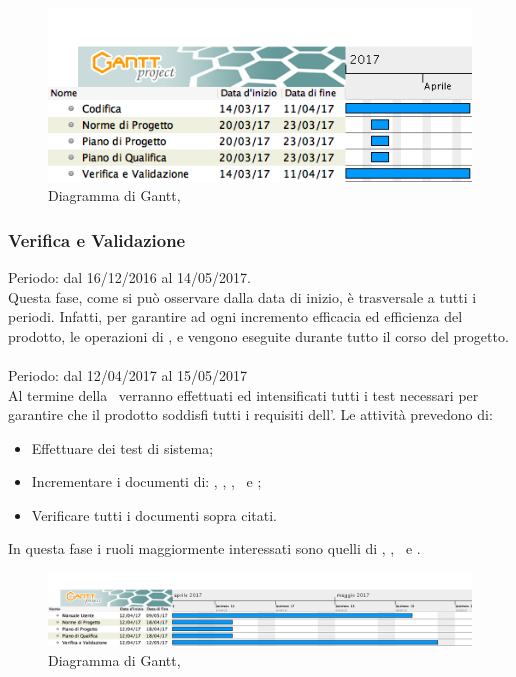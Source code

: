  \begin{figure}[H]
	\centering 
	\includegraphics[scale=0.6]{Immagini/Gantt/COD.png}
	\caption{Diagramma di Gantt, \COD}
\end{figure}

\subsubsection{Verifica e Validazione}
Periodo: dal 16/12/2016 al 14/05/2017.\\

Questa fase, come si può osservare dalla data di inizio, è trasversale a tutti i periodi. Infatti, per garantire ad ogni incremento efficacia ed efficienza del prodotto, le operazioni di ,  e  vengono eseguite durante tutto il corso del progetto.\\

\paragraph{\VV}
Periodo: dal 12/04/2017 al 15/05/2017 \\

Al termine della \COD\ verranno effettuati ed intensificati tutti i test necessari per garantire che il prodotto soddisfi tutti i requisiti dell'\AdR.
Le attività prevedono di:
\begin{itemize}
	\item Effettuare dei test di sistema;
	\item Incrementare i documenti di: \MU, \NdP, \PdP, \PdQ\ e \Gl;
	\item Verificare tutti i documenti sopra citati.
\end{itemize}
In questa fase i ruoli maggiormente interessati sono quelli di \Ver, \Prog, \Am\ e \Pm.

 \begin{figure}[H]
	\centering 
	\includegraphics[scale=0.4]{Immagini/Gantt/VV.png}
	\caption{Diagramma di Gantt, \VV}
\end{figure}